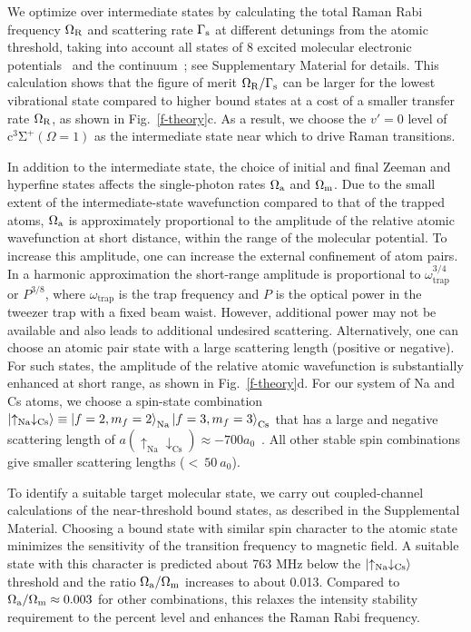 \documentclass[aps,prx,twocolumn,10pt,superscriptaddress]{revtex4-2}
\newcommand{\Na}{\mathrm{Na}}
\newcommand{\Cs}{\mathrm{Cs}}
\begin{document}
We optimize over intermediate states by calculating the total Raman Rabi frequency $\Omega_{\rm R}$
and scattering rate $\Gamma_{\rm s}$ at different detunings from the atomic threshold,
taking into account all states of
8 excited molecular electronic potentials~\cite{Korek2007, Grochola2011, Zaharova2009, Grochola2010, Zabawa2012}
and the continuum~\cite{Liu2017};
see Supplementary Material for details.
This calculation shows that the figure of merit $\Omega_{\rm R}/\Gamma_{\rm s}$
can be larger for the lowest vibrational state compared to higher bound states
at a cost of a smaller transfer rate $\Omega_{\rm R}$, as shown in Fig.~\ref{f-theory}c.
As a result, we choose the $v'=0$ level of $\mathrm{c^3\Sigma^+}(\Omega = 1)$
as the intermediate state near which to drive Raman transitions.

In addition to the intermediate state,
the choice of initial and final Zeeman and hyperfine states affects the single-photon rates $\Omega_{\rm a}$ and $\Omega_{\rm m}$.
Due to the small extent of the intermediate-state wavefunction
compared to that of the trapped atoms,
$\Omega_{\rm a}$ is approximately proportional to
the amplitude of the relative atomic wavefunction at short distance,
within the range of the molecular potential.
To increase this amplitude, one can increase the external confinement of atom pairs.
In a harmonic approximation
the short-range amplitude is proportional to $ \omega_{\text{trap}}^{3/4} $ or $P^{3/8}$,
where $ \omega_{\text{trap}} $ is the trap frequency and $P$ is the optical power in the tweezer trap \cite{Mies2000} with a fixed beam waist. However, additional power may not be available and also leads to additional undesired scattering.
Alternatively, one can choose an atomic pair state with a large scattering length
(positive or negative).
For such states, the amplitude of the relative atomic wavefunction is substantially enhanced
at short range, as shown in Fig.~\ref{f-theory}d.
For our system of Na and Cs atoms,
we choose a spin-state combination $\ket{\uparrow_{\Na} \downarrow_{\Cs}}\equiv \ket{f=2,m_f=2}_{\Na}\ket{f=3,m_f=3}_{\Cs}$ that has a large and negative scattering length of
$a(\uparrow_{\Na} \downarrow_{\Cs}) \approx -700a_0$~\cite{Hood2019}.
All other stable spin combinations give smaller scattering lengths ($<~50~a_0$).

To identify a suitable target molecular state, we carry out coupled-channel calculations of the near-threshold bound states, as described in the Supplemental Material.
Choosing a bound state with similar spin character to the atomic state  minimizes the sensitivity of the transition frequency to magnetic field.
A suitable state with this character is predicted about 763 MHz below the $\ket{\uparrow_{\Na} \downarrow_{\Cs}}$ threshold and the ratio $\Omega_{\rm a}/\Omega_{\rm m}$ increases to about 0.013.
Compared to $\Omega_{\rm a}/\Omega_{\rm m} \approx 0.003$
for other combinations, this relaxes the intensity stability requirement to the percent level and enhances the Raman Rabi frequency.
\end{document}
